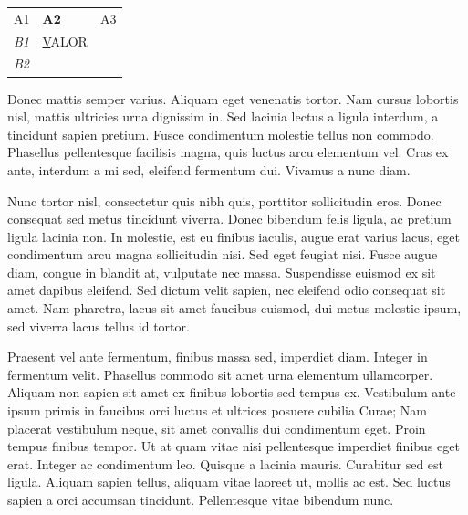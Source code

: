 \documentclass{article}
\begin{document}
	\begin{table}[h]
		\centering
		\begin{tabular}{|l|l|l|}
			\hline
			A1          & \textbf{A2} & \multicolumn{1}{r|}{A3}  \\ \cline{1-1} \cline{3-3} 
			\textit{B1} & {\ul VALOR} & \cellcolor[HTML]{FD6864} \\ \hline
			\textit{B2} &             &                          \\ \hline
		\end{tabular}
	\end{table}
	
	Donec mattis semper varius. Aliquam eget venenatis tortor. Nam cursus lobortis nisl, mattis ultricies urna dignissim in. Sed lacinia lectus a ligula interdum, a tincidunt sapien pretium. Fusce condimentum molestie tellus non commodo. Phasellus pellentesque facilisis magna, quis luctus arcu elementum vel. Cras ex ante, interdum a mi sed, eleifend fermentum dui. Vivamus a nunc diam.
	
	Nunc tortor nisl, consectetur quis nibh quis, porttitor sollicitudin eros. Donec consequat sed metus tincidunt viverra. Donec bibendum felis ligula, ac pretium ligula lacinia non. In molestie, est eu finibus iaculis, augue erat varius lacus, eget condimentum arcu magna sollicitudin nisi. Sed eget feugiat nisi. Fusce augue diam, congue in blandit at, vulputate nec massa. Suspendisse euismod ex sit amet dapibus eleifend. Sed dictum velit sapien, nec eleifend odio consequat sit amet. Nam pharetra, lacus sit amet faucibus euismod, dui metus molestie ipsum, sed viverra lacus tellus id tortor.
	
	Praesent vel ante fermentum, finibus massa sed, imperdiet diam. Integer in fermentum velit. Phasellus commodo sit amet urna elementum ullamcorper. Aliquam non sapien sit amet ex finibus lobortis sed tempus ex. Vestibulum ante ipsum primis in faucibus orci luctus et ultrices posuere cubilia Curae; Nam placerat vestibulum neque, sit amet convallis dui condimentum eget. Proin tempus finibus tempor. Ut at quam vitae nisi pellentesque imperdiet finibus eget erat. Integer ac condimentum leo. Quisque a lacinia mauris. Curabitur sed est ligula. Aliquam sapien tellus, aliquam vitae laoreet ut, mollis ac est. Sed luctus sapien a orci accumsan tincidunt. Pellentesque vitae bibendum nunc.
	
\end{document}
